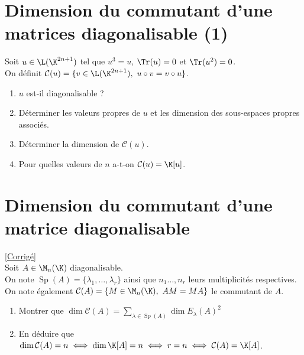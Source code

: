 \documentclass[8pt]{book}
\begin{document}
	\section{Dimension du commutant d'une matrices diagonalisable (1) }
	Soit $u\in \L(\K^{2n+1})$ tel que $u^3=u$, $\Tr(u)=0$ et $\Tr(u^2)=0$.\\
	On définit $\mathcal C(u)=\{v\in \L(\K^{2n+1}),\ u\circ v=v\circ u\}$.
	\begin{enumerate}
		\item $u$ est-il diagonalisable ?
		\item Déterminer les valeurs propres de $u$ et les dimension des sous-espaces propres associés.
		\item Déterminer la dimension de $\mathcal C(u)$.
		\item Pour quelles valeurs de $n$ a-t-on $\mathcal C(u)=\K[u]$.
	\end{enumerate}
	
	\section{Dimension du commutant d'une matrice diagonalisable }
	\label{Dimension du commutant d'une matrice diagonalisable}
	\textcolor{blue}{\hyperref[Dimension du commutant d'une matrice diagonalisable corrigé]{[Corrigé]}}\\
	Soit $A\in \M_n(\K)$ diagonalisable.\\
	On note $\operatorname{Sp}(A)=\{\lambda_1,\dots,\lambda_r\}$ ainsi que $n_1\dots,n_r$ leurs multiplicités respectives.\\ On note également $\mathcal{C}(A)=\{ M\in \M_n(\K),\ AM=MA\}$ le commutant de $A$.\\
	\begin{enumerate}
		\item Montrer que $\dim\mathcal{C}(A)=\displaystyle\sum\limits_{\lambda\in \operatorname{Sp}(A)}{\dim E_\lambda(A)^2}$
		\item En déduire que $\dim \mathcal{C}(A)=n\iff \dim \K[A]=n\iff r=n\iff \mathcal{C}(A)=\K[A]$.
	\end{enumerate}
	
\end{document}
